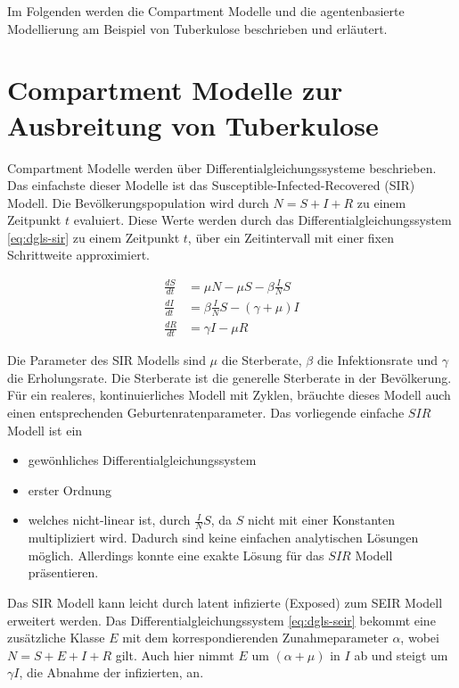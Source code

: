 \documentclass[paper=a4, fontsize=11pt, ngerman, abstract=on]{scrartcl}
\numberwithin{equation}{section} %
\numberwithin{figure}{section} %
\numberwithin{table}{section} %
\begin{document}
Im Folgenden werden die Compartment Modelle und die agentenbasierte Modellierung am Beispiel von Tuberkulose beschrieben und erläutert.

\section{Compartment Modelle zur Ausbreitung von Tuberkulose}

Compartment Modelle werden über Differentialgleichungssysteme beschrieben. Das einfachste dieser Modelle ist das Susceptible-Infected-Recovered (SIR) Modell. Die Bevölkerungspopulation wird durch $N = S + I + R$ zu einem Zeitpunkt $t$ evaluiert. Diese Werte werden durch das Differentialgleichungssystem \ref{eq:dgls-sir} zu einem Zeitpunkt $t$, über ein Zeitintervall mit einer fixen Schrittweite approximiert. \cite{MathOfInfectiousDiseases2000}

\begin{equation}
\begin{split}
  \frac{dS}{dt} &= \mu N - \mu S - \beta \frac{I}{N}S \\
  \frac{dI}{dt} &= \beta \frac{I}{N}S  - (\gamma + \mu)I \\
  \frac{dR}{dt} &= \gamma I - \mu R
\end{split}
\label{eq:dgls-sir}
\end{equation}

Die Parameter des SIR Modells sind $\mu$ die Sterberate, $\beta$ die Infektionsrate und $\gamma$ die Erholungsrate. Die Sterberate ist die generelle Sterberate in der Bevölkerung. Für ein realeres, kontinuierliches Modell mit Zyklen, bräuchte dieses Modell auch einen entsprechenden Geburtenratenparameter. Das vorliegende einfache $SIR$ Modell ist ein

\begin{itemize}
  \item{gewönhliches Differentialgleichungssystem}
  \item{erster Ordnung}
  \item{welches nicht-linear ist, durch $\frac{I}{N}S$, da $S$ nicht mit einer Konstanten multipliziert wird. Dadurch sind keine einfachen analytischen Lösungen möglich. Allerdings konnte \cite{Harko2014} eine exakte Lösung für das $SIR$ Modell präsentieren.}
\end{itemize}

 Das SIR Modell kann leicht durch latent infizierte (Exposed) zum SEIR Modell erweitert werden. Das Differentialgleichungssystem \ref{eq:dgls-seir} bekommt eine zusätzliche Klasse $E$ mit dem korrespondierenden Zunahmeparameter $\alpha$, wobei $N = S + E + I + R$ gilt. Auch hier nimmt $E$ um $(\alpha + \mu)$ in $I$ ab und steigt um $\gamma I$, die Abnahme der infizierten, an. \cite{MathOfInfectiousDiseases2000}
\end{document}

